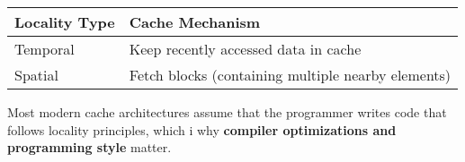 \begin{table}[!htp]
    \centering
    \begin{tabular}{@{} l l @{}}
        \toprule
        Locality Type & Cache Mechanism \\
        \midrule
        Temporal    & Keep recently accessed data in cache \\ [.3em]
        Spatial     & Fetch blocks (containing multiple nearby elements) \\
        \bottomrule
    \end{tabular}
\end{table}

\noindent
Most modern cache architectures assume that the programmer writes code that follows locality principles, which i why \textbf{compiler optimizations and programming style} matter.